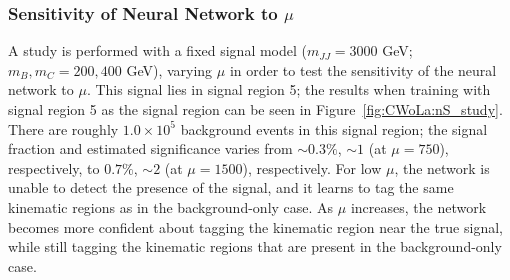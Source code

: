 

\subsubsection{Sensitivity of Neural Network to $\mu$}
\label{sec:CWoLa:app:CWoLa:nS}
A study is performed with a fixed signal model ($m_{JJ} = 3000$ GeV; $m_B,m_C = 200,400$ GeV), varying $\mu$ in order to test the sensitivity of the neural network to $\mu$.
This signal lies in signal region 5; the results when training with signal region 5 as the signal region can be seen in Figure~\ref{fig:CWoLa:nS_study}.
There are roughly $1.0\times10^5$ background events in this signal region; the signal fraction and estimated significance varies from $\sim 0.3\%$, $\sim 1$ (at $\mu=750$), respectively, to $0.7\%$, $\sim 2$ (at $\mu=1500$), respectively.
For low $\mu$, the network is unable to detect the presence of the signal, and it learns to tag the same kinematic regions as in the background-only case.
As $\mu$ increases, the network becomes more confident about tagging the kinematic region near the true signal, while still tagging the kinematic regions that are present in the background-only case.

